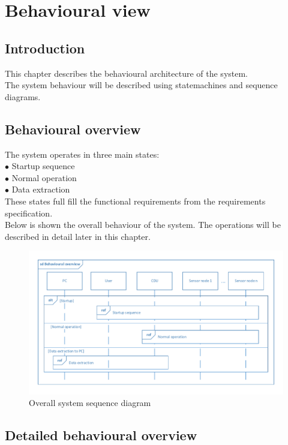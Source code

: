 \chapter{Behavioural view}

\section{Introduction}
This chapter describes the behavioural architecture of the system.\\
The system behaviour will be described using statemachines and sequence diagrams.\\

\section{Behavioural overview}
The system operates in three main states:\\
$\bullet$ Startup sequence\\
$\bullet$ Normal operation\\
$\bullet$ Data extraction\\
These states full fill the functional requirements from the requirements specification.\\
Below is shown the overall behaviour of the system. The operations will be described in detail later in this chapter.
\begin{figure}
\centering
\includegraphics[width=1\textwidth]{billeder/behavioural_overview_SD}
\caption{Overall system sequence diagram}
\end{figure}

\section{Detailed behavioural overview}

